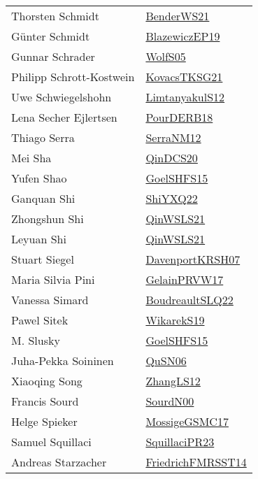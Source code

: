 {\begin{longtable}{p{4cm}p{20cm}}
Thorsten Schmidt & \href{papers/BenderWS21.pdf}{BenderWS21}\cite{BenderWS21} \\
Günter Schmidt & \href{}{BlazewiczEP19}\cite{BlazewiczEP19} \\
Gunnar Schrader & \href{papers/WolfS05.pdf}{WolfS05}\cite{WolfS05} \\
Philipp Schrott{-}Kostwein & \href{papers/KovacsTKSG21.pdf}{KovacsTKSG21}\cite{KovacsTKSG21} \\
Uwe Schwiegelshohn & \href{articles/LimtanyakulS12.pdf}{LimtanyakulS12}\cite{LimtanyakulS12} \\
Lena Secher Ejlertsen & \href{articles/PourDERB18.pdf}{PourDERB18}\cite{PourDERB18} \\
Thiago Serra & \href{papers/SerraNM12.pdf}{SerraNM12}\cite{SerraNM12} \\
Mei Sha & \href{articles/QinDCS20.pdf}{QinDCS20}\cite{QinDCS20} \\
Yufen Shao & \href{articles/GoelSHFS15.pdf}{GoelSHFS15}\cite{GoelSHFS15} \\
Ganquan Shi & \href{}{ShiYXQ22}\cite{ShiYXQ22} \\
Zhongshun Shi & \href{articles/QinWSLS21.pdf}{QinWSLS21}\cite{QinWSLS21} \\
Leyuan Shi & \href{articles/QinWSLS21.pdf}{QinWSLS21}\cite{QinWSLS21} \\
Stuart Siegel & \href{papers/DavenportKRSH07.pdf}{DavenportKRSH07}\cite{DavenportKRSH07} \\
Maria Silvia Pini & \href{papers/GelainPRVW17.pdf}{GelainPRVW17}\cite{GelainPRVW17} \\
Vanessa Simard & \href{papers/BoudreaultSLQ22.pdf}{BoudreaultSLQ22}\cite{BoudreaultSLQ22} \\
Pawel Sitek & \href{articles/WikarekS19.pdf}{WikarekS19}\cite{WikarekS19} \\
M. Slusky & \href{articles/GoelSHFS15.pdf}{GoelSHFS15}\cite{GoelSHFS15} \\
Juha{-}Pekka Soininen & \href{papers/QuSN06.pdf}{QuSN06}\cite{QuSN06} \\
Xiaoqing Song & \href{papers/ZhangLS12.pdf}{ZhangLS12}\cite{ZhangLS12} \\
Francis Sourd & \href{}{SourdN00}\cite{SourdN00} \\
Helge Spieker & \href{papers/MossigeGSMC17.pdf}{MossigeGSMC17}\cite{MossigeGSMC17} \\
Samuel Squillaci & \href{papers/SquillaciPR23.pdf}{SquillaciPR23}\cite{SquillaciPR23} \\
Andreas Starzacher & \href{}{FriedrichFMRSST14}\cite{FriedrichFMRSST14} \\

\end{longtable}}

